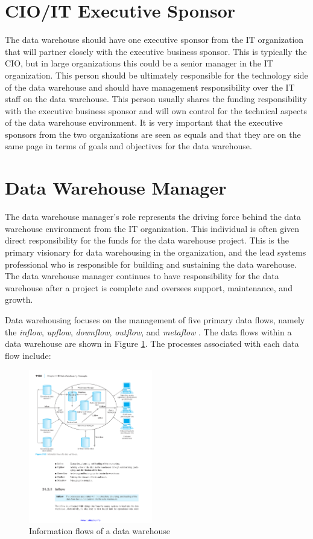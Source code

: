 \documentclass{vldb}
\begin{document}
\section{CIO/IT Executive Sponsor}
The data warehouse should have one executive sponsor from the IT organization that will partner closely with the executive business sponsor. This is typically the CIO, but in large organizations this could be a senior manager in the IT organization. This person should be ultimately responsible for the technology side of the data warehouse and should have management responsibility over the IT staff on the data warehouse. This person usually shares the funding responsibility with the executive business sponsor and will own control for the technical aspects of the data warehouse environment. It is very important that the executive sponsors from the two organizations are seen as equals and that they are on the same page in terms of goals and objectives for the data warehouse. \cite{Reeves:DW}

\section{Data Warehouse Manager}
The data warehouse manager’s role represents the driving force behind the data warehouse environment from the IT organization. This individual is often given direct responsibility for the funds for the data warehouse project. This is the primary visionary for data warehousing in the organization, and the lead systems professional who is responsible for building and sustaining the data warehouse. The data warehouse manager continues to have responsibility for the data warehouse after a project is complete and oversees support, maintenance, and growth.

Data warehousing focuses on the management of five primary data flows, namely the \textit{inflow}, \textit{upflow}, \textit{downflow}, \textit{outflow}, and \textit{metaflow}  \cite{Thomas:DW}. The data flows within a data warehouse are shown in Figure \ref{fig:dwflow}. The processes associated with each data flow include:

\begin{figure}[htb]
\centering
\includegraphics[width=0.48\textwidth]{dwflow}
\caption{Information flows of a data warehouse}
\label{fig:dwflow}
\end{figure}
\end{document}
